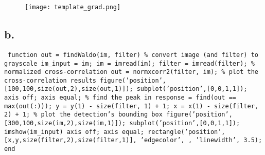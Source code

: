 \documentclass{article}
\begin{document}
\begin{figure}[h!]
\centering
\texttt{[image: template\_grad.png]}
\label{fig:sample graph}
\end{figure}


\subsection*{b.}

\texttt{\noindent
function out = findWaldo(im, filter)
\newline\indent
\% convert image (and filter) to grayscale
\newline\indent
im\_input = im;
\newline\indent
im = imread(im);
\newline\indent
filter = imread(filter);
\newline\newline\indent
\% normalized cross-correlation
\newline\indent
out = normxcorr2(filter, im);
\newline\newline\indent
\% plot the cross-correlation results
\newline\indent
figure('position', [100,100,size(out,2),size(out,1)]);
\newline\indent
subplot('position',[0,0,1,1]);
\newline\indent
axis off;
\newline\indent
axis equal;
\newline\newline\indent
\% find the peak in response
\newline\indent
[y,x] = find(out == max(out(:)));
\newline\indent
y = y(1) - size(filter, 1) + 1;
\newline\indent
x = x(1) - size(filter, 2) + 1;
\newline\newline\indent
\% plot the detection's bounding box
\newline\indent
figure('position', [300,100,size(im,2),size(im,1)]);
\newline\indent
subplot('position',[0,0,1,1]);
\newline\indent
imshow(im\_input)
\newline\indent
axis off;
\newline\indent
axis equal;
\newline\indent
rectangle('position', [x,y,size(filter,2),size(filter,1)], 'edgecolor',
\newline\indent
[0.1,0.2,1], 'linewidth', 3.5);
\newline
end
}
\end{document}
